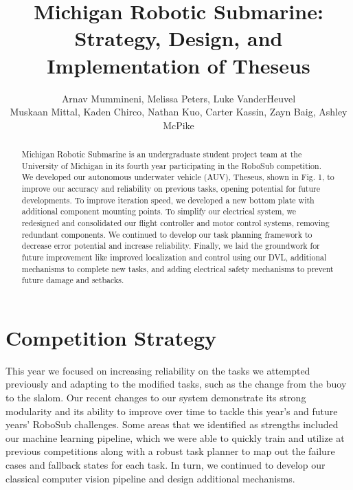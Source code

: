 \documentclass[conference]{IEEEtran}
\begin{document}
\title{Michigan Robotic Submarine: Strategy, Design, and Implementation of Theseus}
\author{
Arnav Mummineni, Melissa Peters, Luke VanderHeuvel %
\\ 
Muskaan Mittal, Kaden Chirco, Nathan Kuo, Carter Kassin, Zayn Baig, Ashley McPike %
}


\maketitle
\pagestyle{fancy}
\rhead{\thepage}

\begin{abstract}
Michigan Robotic Submarine is an undergraduate student project team at the University of Michigan in its fourth year participating in the RoboSub competition. We developed our autonomous underwater vehicle (AUV), Theseus, shown in Fig. 1, to improve our accuracy and reliability on previous tasks, opening potential for future developments. To improve iteration speed, we developed a new bottom plate with additional component mounting points. To simplify our electrical system, we redesigned and consolidated our flight controller and motor control systems, removing redundant components. We continued to develop our task planning framework to decrease error potential and increase reliability. Finally, we laid the groundwork for future improvement like improved localization and control using our DVL, additional mechanisms to complete new tasks, and adding electrical safety mechanisms to prevent future damage and setbacks.

\end{abstract}

\section{Competition Strategy} \label{sec:comp_strat}
This year we focused on increasing reliability on the tasks we attempted previously and adapting to the modified tasks, such as the change from the buoy to the slalom. Our recent changes to our system demonstrate its strong modularity and its ability to improve over time to tackle this year’s and future years’ RoboSub challenges. Some areas that we identified as strengths included our machine learning pipeline, which we were able to quickly train and utilize at previous competitions along with a robust task planner to map out the failure cases and fallback states for each task. In turn, we continued to develop our classical computer vision pipeline and design additional mechanisms.
\end{document}
